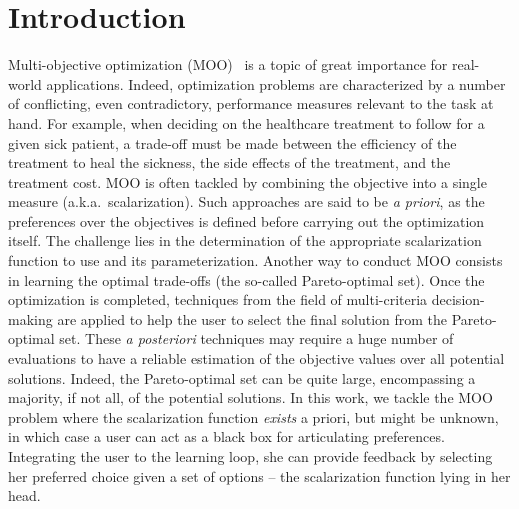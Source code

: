 
\section{Introduction}
\label{sec:intro}

Multi-objective optimization (MOO)~\cite{Coello2007} is a topic of great importance for real-world applications. Indeed, optimization problems are characterized by a number of conflicting, even contradictory, performance measures relevant to the task at hand. For example, when deciding on the healthcare treatment to follow for a given sick patient, a trade-off must be made between the efficiency of the treatment to heal the sickness, the side effects of the treatment, and the treatment cost. MOO is often tackled by combining the objective into a single measure (a.k.a.~scalarization). Such approaches are said to be \emph{a priori}, as the preferences over the objectives is defined before carrying out the optimization itself. The challenge lies in the determination of the appropriate scalarization function to use and its parameterization. Another way to conduct MOO consists in learning the optimal trade-offs (the so-called Pareto-optimal set). Once the optimization is completed, techniques from the field of multi-criteria decision-making are applied to help the user to select the final solution from the Pareto-optimal set. These \emph{a posteriori} techniques may require a huge number of evaluations to have a reliable estimation of the objective values over all potential solutions. Indeed, the Pareto-optimal set can be quite large, encompassing a majority, if not all, of the potential solutions. In this work, we tackle the MOO problem where the scalarization function \emph{exists} a priori, but might be unknown, in which case a user can act as a black box for articulating preferences. Integrating the user to the learning loop, she can provide feedback by selecting her preferred choice given a set of options -- the scalarization function lying in her head.

